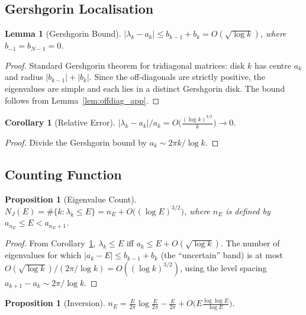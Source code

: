 \documentclass{pre-aomart}
\theoremstyle{plain}
\newtheorem{lemma}[theorem]{Lemma}
\newtheorem{proposition}[theorem]{Proposition}
\newtheorem{corollary}[theorem]{Corollary}
\theoremstyle{definition}
\theoremstyle{remark}
\begin{document}
\subsection*{Gershgorin Localisation}

\begin{lemma}[Gershgorin Bound]\label{lem:gresh_app}
$|\lambda_k - a_k| \le b_{k-1} + b_k = O(\sqrt{\log k})$,
where $b_{-1} = b_{N-1} = 0$.
\end{lemma}

\begin{proof}
Standard Gershgorin theorem for tridiagonal matrices: disk $k$ has centre
$a_k$ and radius $|b_{k-1}| + |b_k|$.  Since the off-diagonals are strictly
positive, the eigenvalues are simple and each lies in a distinct Gershgorin
disk.  The bound follows from Lemma~\ref{lem:offdiag_app}.
\end{proof}

\begin{corollary}[Relative Error]\label{cor:rel_err}
$|\lambda_k - a_k|/a_k = O\bigl(\frac{(\log k)^{3/2}}{k}\bigr) \to 0$.
\end{corollary}

\begin{proof}
Divide the Gershgorin bound by $a_k \sim 2\pi k/\log k$.
\end{proof}

\subsection*{Counting Function}

\begin{proposition}[Eigenvalue Count]\label{prop:count_app}
$N_J(E) = \#\{k : \lambda_k \le E\} = n_E + O\bigl((\log E)^{3/2}\bigr)$,
where $n_E$ is defined by $a_{n_E} \le E < a_{n_E+1}$.
\end{proposition}

\begin{proof}
From Corollary~\ref{cor:rel_err}, $\lambda_k \le E$ iff
$a_k \le E + O(\sqrt{\log k})$.  The number of eigenvalues for which
$|a_k - E| \le b_{k-1} + b_k$ (the ``uncertain'' band) is at most
$O(\sqrt{\log k}) / (2\pi/\log k) = O((\log k)^{3/2})$,
using the level spacing $a_{k+1} - a_k \sim 2\pi/\log k$.
\end{proof}

\begin{proposition}[Inversion]\label{prop:inv_app}
$n_E = \frac{E}{2\pi}\log\frac{E}{2\pi} - \frac{E}{2\pi}
       + O\bigl(E\frac{\log\log E}{\log E}\bigr)$.
\end{proposition}
\end{document}
